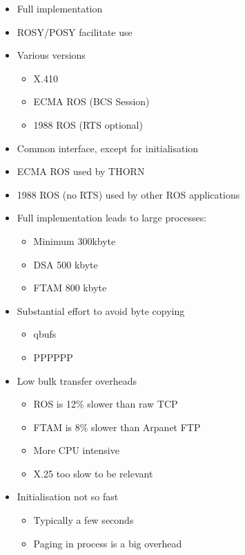 \begin {bwslide}


\begin {itemize}
\item Full implementation
\item  ROSY/POSY facilitate use
\item  Various versions 
\begin {itemize}
\item X.410 
\item ECMA ROS (BCS Session)
\item 1988 ROS (RTS optional)
\end {itemize}

\item Common interface, except for initialisation

\item ECMA ROS used by THORN

\item 1988 ROS (no RTS) used by other ROS applications
\end {itemize}
\end {bwslide}



\begin {bwslide}
\begin {itemize}
\item Full implementation leads to large processes:
\begin {itemize}
\item Minimum 300kbyte
\item DSA 500 kbyte
\item FTAM 800 kbyte
\end {itemize}

\item Substantial effort to avoid byte copying
\begin {itemize}
\item qbufs
\item PPPPPP
\end {itemize}

\item Low bulk transfer overheads
\begin {itemize}
\item  ROS is 12\% slower than raw TCP
\item  FTAM is 8\% slower than Arpanet FTP
\item  More CPU intensive
\item  X.25 too slow to be relevant
\end {itemize}

\item Initialisation not so fast
\begin {itemize}
\item Typically a few seconds
\item Paging in process is a big overhead
\end {itemize}

\end {itemize}
\end {bwslide}


